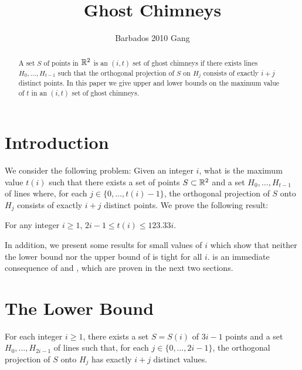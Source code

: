 \documentclass{patmorin}
\title{Ghost Chimneys}
\author{Barbados 2010 Gang}
\begin{document}
\maketitle

\begin{abstract}
A set $S$ of points in $\mathbb{R}^2$ is an $(i,t)$ set of ghost chimneys
if there exists lines $H_0,\ldots,H_{t-1}$ such that the orthogonal
projection of $S$ on $H_j$ consists of exactly $i+j$ distinct points.
In this paper we give upper and lower bounds on the maximum value of $t$
in an $(i,t)$ set of ghost chimneys.
\end{abstract}

\section{Introduction}

We consider the following problem:  Given an integer $i$, what
is the maximum value $t(i)$ such that there exists a set of points
$S\subset\mathbb{R}^2$ and a set $H_0,\ldots,H_{t-1}$ of lines where, for each
$j\in\{0,\ldots,t(i)-1\}$, the orthogonal projection of $S$ onto $H_j$
consists of exactly $i+j$ distinct points.  We prove the following result:

\begin{thm}
For any integer $i\ge 1$,  $2i -1 \le t(i) \le 123.33i$.
\end{thm}

In addition, we present some results for small values of $i$ which
show that neither the lower bound nor the upper bound of 
is tight for all $i$.   is an immediate consequence of
 and , which are proven in the
next two sections.

\section{The Lower Bound}

\begin{lem}
For each integer $i\ge 1$, there exists a set $S=S(i)$ of $3i-1$
points and a set $H_0,\ldots,H_{2i-1}$ of lines such that, for each
$j\in\{0,\ldots,2i-1\}$, the orthogonal projection of $S$ onto $H_j$
has exactly $i+j$ distinct values.
\end{lem}
\end{document}
